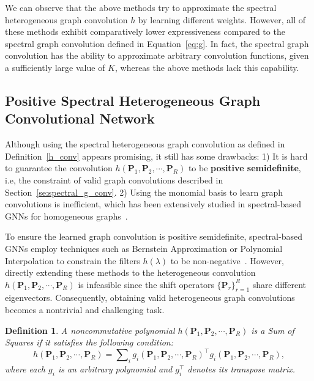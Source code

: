 \documentclass{article}
\newtheorem{definition}{Definition}[section]
\begin{document}
We can observe that the above methods try to approximate the spectral heterogeneous graph convolution $h$ by learning different weights. 
However, all of these methods exhibit comparatively lower expressiveness compared to the spectral graph convolution defined in Equation~\eqref{eq:g}. 
In fact, the spectral graph convolution has the ability to approximate arbitrary convolution functions, given a sufficiently large value of $K$, whereas the above methods lack this capability.


























\subsection{Positive Spectral Heterogeneous Graph Convolutional Network}
Although using the spectral heterogeneous graph convolution as defined in Definition~\ref{h_conv} appears promising, it still has some drawbacks: 1) It is hard to guarantee the convolution $h(\mathbf{P}_1,\mathbf{P}_2,\cdots,\mathbf{P}_R)$ to be \textbf{positive semidefinite}, i.e, the constraint of valid graph convolutions described in Section~\ref{se:spectral_g_conv}. 2) Using the monomial basis to learn graph convolutions is inefficient, which has been extensively studied in spectral-based GNNs for homogeneous graphs~\cite{bernnet,jacobi,chebnetii}.

To ensure the learned graph convolution is positive semidefinite, spectral-based GNNs employ techniques such as Bernstein Approximation or Polynomial Interpolation to constrain the filters $h(\lambda)$ to be non-negative~\cite{bernnet,chebnetii}. However, directly extending these methods to the heterogeneous convolution $h(\mathbf{P}_1,\mathbf{P}_2,\cdots,\mathbf{P}_R)$ is infeasible since the shift operators $\{\mathbf{P}_{r}\}_{r=1}^R$ share different eigenvectors. Consequently, obtaining valid heterogeneous graph convolutions becomes a nontrivial and challenging task.




\begin{definition}\label{sos}
{\rm \cite{positive-poly}}
A noncommutative polynomial $h(\mathbf{P}_1,\mathbf{P}_2,\cdots,\mathbf{P}_R)$ is a Sum of Squares if it satisfies the following condition:
\begin{equation}
    h(\mathbf{P}_1,\mathbf{P}_2,\cdots,\mathbf{P}_R) = \sum\nolimits_{i}g_i(\mathbf{P}_1,\mathbf{P}_2,\cdots,\mathbf{P}_R)^{\top}g_i(\mathbf{P}_1,\mathbf{P}_2,\cdots,\mathbf{P}_R),
\end{equation}
where each $g_i$ is an arbitrary polynomial and $g_i^{\top}$ denotes its transpose matrix.
\end{definition}
\end{document}
